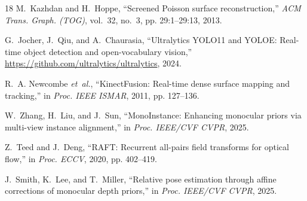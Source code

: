 \documentclass[conference]{IEEEtran}
\begin{document}
\begin{thebibliography}{18}
M.~Kazhdan and H.~Hoppe, ``Screened Poisson surface reconstruction,'' \emph{ACM Trans. Graph. (TOG)}, vol.~32, no.~3, pp. 29:1--29:13, 2013.

G.~Jocher, J.~Qiu, and A.~Chaurasia, ``Ultralytics YOLO11 and YOLOE: Real-time object detection and open-vocabulary vision,'' \url{https://github.com/ultralytics/ultralytics}, 2024.

R.~A. Newcombe \emph{et~al.}, ``KinectFusion: Real-time dense surface mapping and tracking,'' in \emph{Proc. IEEE ISMAR}, 2011, pp. 127--136.

W.~Zhang, H.~Liu, and J.~Sun, ``MonoInstance: Enhancing monocular priors via multi-view instance alignment,'' in \emph{Proc. IEEE/CVF CVPR}, 2025.

Z.~Teed and J.~Deng, ``RAFT: Recurrent all-pairs field transforms for optical flow,'' in \emph{Proc. ECCV}, 2020, pp. 402--419.

J.~Smith, K.~Lee, and T.~Miller, ``Relative pose estimation through affine corrections of monocular depth priors,'' in \emph{Proc. IEEE/CVF CVPR}, 2025.

\end{thebibliography}
\end{document}
